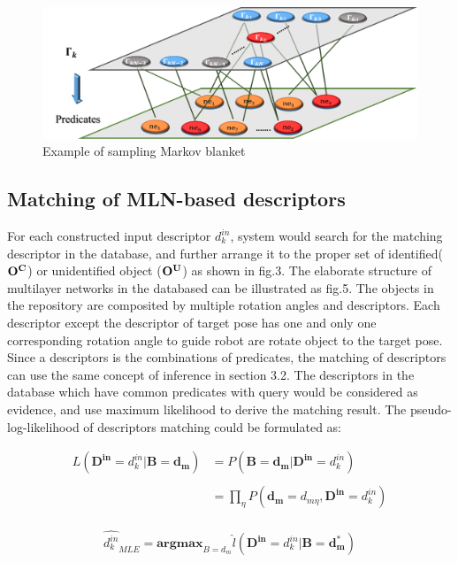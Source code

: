 \documentclass[journal]{IEEEtran}
\begin{document}
\begin{figure}[!t]
\begin{center}
\includegraphics*[width=3 in]{j_img/fig4.png}
\caption{Example of sampling Markov blanket}\label{test}
\end{center}
\end{figure}

\subsection{Matching of MLN-based descriptors}
For each constructed input descriptor $d^{in}_k$, system would search for the matching descriptor in the database, and further arrange it to the proper set of identified($\bf{O^C}$) or unidentified object ($\bf{O^U}$) as shown in fig.3. The elaborate structure of multilayer networks in the databased can be illustrated as fig.5. The objects in the repository are composited by multiple rotation angles and descriptors. Each descriptor except the descriptor of target pose has one and only one corresponding rotation angle to guide robot are rotate object to the target pose. 
Since a descriptors is the combinations of predicates, the matching of descriptors can use the same concept of inference in section 3.2. The descriptors in the database which have common predicates with query would be considered as evidence, and use maximum likelihood to derive the matching result. The pseudo-log-likelihood of descriptors matching could be formulated as:

\begin{equation}
\begin{array}{ll}
L(\mathbf{D^{in}}=d^{in}_k|\mathbf{B=d_m})&=P(\mathbf{B=d_m}|\mathbf{D^{in}}=d^{in}_k)\\\\
 &=\prod_{\eta}P(\mathbf{d_m}=d_{m\eta},\mathbf{D^{in}}=d^{in}_k) \\
\end{array}
\end{equation}

\begin{equation}
\hat{d^{in}_k}_{MLE}=\mathbf{argmax}_{B=d_m}\hat{l}(\mathbf{D^{in}}=d^{in}_k|\mathbf{B}=\mathbf{d_m^*})
\end{equation}
\end{document}
